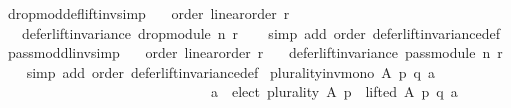 \begin{isabellebody}
\isamarkupfalse%
\ drop{\isacharunderscore}{\kern0pt}mod{\isacharunderscore}{\kern0pt}def{\isacharunderscore}{\kern0pt}lift{\isacharunderscore}{\kern0pt}inv{\isacharbrackleft}{\kern0pt}simp{\isacharbrackright}{\kern0pt}{\isacharcolon}{\kern0pt}\isanewline
\ \ \ order{\isacharcolon}{\kern0pt}\ {\isachardoublequoteopen}linear{\isacharunderscore}{\kern0pt}order\ r{\isachardoublequoteclose}\isanewline
\ \ \ {\isachardoublequoteopen}defer{\isacharunderscore}{\kern0pt}lift{\isacharunderscore}{\kern0pt}invariance\ {\isacharparenleft}{\kern0pt}drop{\isacharunderscore}{\kern0pt}module\ n\ r{\isacharparenright}{\kern0pt}{\isachardoublequoteclose}\isanewline
%
\isadelimproof
\ \ %
\endisadelimproof
%
\isatagproof
{}\isamarkupfalse%
\ {\isacharparenleft}{\kern0pt}simp\ add{\isacharcolon}{\kern0pt}\ order\ defer{\isacharunderscore}{\kern0pt}lift{\isacharunderscore}{\kern0pt}invariance{\isacharunderscore}{\kern0pt}def{\isacharparenright}{\kern0pt}%
\endisatagproof
{\isafoldproof}%
%
\isadelimproof
\isanewline
%
\endisadelimproof
\isanewline
\isanewline
{}\isamarkupfalse%
\ pass{\isacharunderscore}{\kern0pt}mod{\isacharunderscore}{\kern0pt}dl{\isacharunderscore}{\kern0pt}inv{\isacharbrackleft}{\kern0pt}simp{\isacharbrackright}{\kern0pt}{\isacharcolon}{\kern0pt}\isanewline
\ \ \ order{\isacharcolon}{\kern0pt}\ {\isachardoublequoteopen}linear{\isacharunderscore}{\kern0pt}order\ r{\isachardoublequoteclose}\isanewline
\ \ \ {\isachardoublequoteopen}defer{\isacharunderscore}{\kern0pt}lift{\isacharunderscore}{\kern0pt}invariance\ {\isacharparenleft}{\kern0pt}pass{\isacharunderscore}{\kern0pt}module\ n\ r{\isacharparenright}{\kern0pt}{\isachardoublequoteclose}\isanewline
%
\isadelimproof
\ \ %
\endisadelimproof
%
\isatagproof
{}\isamarkupfalse%
\ {\isacharparenleft}{\kern0pt}simp\ add{\isacharcolon}{\kern0pt}\ order\ defer{\isacharunderscore}{\kern0pt}lift{\isacharunderscore}{\kern0pt}invariance{\isacharunderscore}{\kern0pt}def{\isacharparenright}{\kern0pt}%
\endisatagproof
{\isafoldproof}%
%
\isadelimproof
\isanewline
%
\endisadelimproof
\isanewline
{}\isamarkupfalse%
\ plurality{\isacharunderscore}{\kern0pt}inv{\isacharunderscore}{\kern0pt}mono{}{\isacharcolon}{\kern0pt}\ {\isachardoublequoteopen}{\isasymforall}A\ p\ q\ a{\isachardot}{\kern0pt}\isanewline
\ \ \ \ \ \ \ \ \ \ \ \ \ \ \ \ \ \ \ \ \ \ \ \ \ \ \ \ \ \ {\isacharparenleft}{\kern0pt}a\ {\isasymin}\ elect\ plurality\ A\ p\ {\isasymand}\ lifted\ A\ p\ q\ a{\isacharparenright}{\kern0pt}\ {\isasymlongrightarrow}\isanewline

\end{isabellebody}
